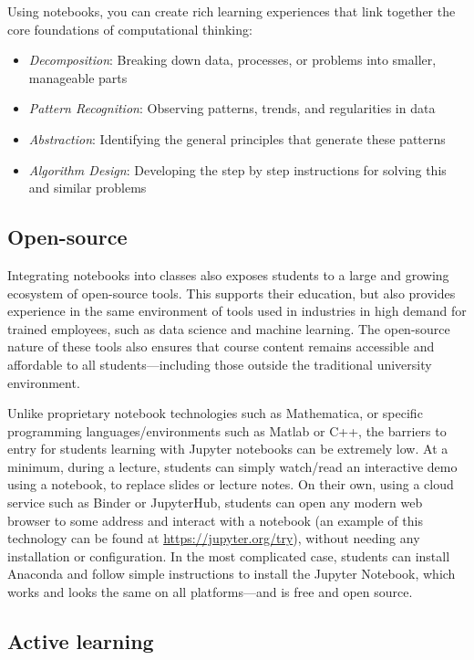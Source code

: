 \documentclass[]{book}
\providecommand{\tightlist}{%
  \setlength{\itemsep}{0pt}\setlength{\parskip}{0pt}}
\begin{document}
Using notebooks, you can create rich learning experiences that link
together the core foundations of computational thinking:

\begin{itemize}
\tightlist
\item
  \emph{Decomposition}: Breaking down data, processes, or problems into
  smaller, manageable parts
\item
  \emph{Pattern Recognition}: Observing patterns, trends, and
  regularities in data
\item
  \emph{Abstraction}: Identifying the general principles that generate
  these patterns
\item
  \emph{Algorithm Design}: Developing the step by step instructions for
  solving this and similar problems
\end{itemize}

\subsection{Open-source}\label{open-source}

Integrating notebooks into classes also exposes students to a large and
growing ecosystem of open-source tools. This supports their education,
but also provides experience in the same environment of tools used in
industries in high demand for trained employees, such as data science
and machine learning. The open-source nature of these tools also ensures
that course content remains accessible and affordable to all
students---including those outside the traditional university
environment.

Unlike proprietary notebook technologies such as Mathematica, or
specific programming languages/environments such as Matlab or C++, the
barriers to entry for students learning with Jupyter notebooks can be
extremely low. At a minimum, during a lecture, students can simply
watch/read an interactive demo using a notebook, to replace slides or
lecture notes. On their own, using a cloud service such as Binder or
JupyterHub, students can open any modern web browser to some address and
interact with a notebook (an example of this technology can be found at
\url{https://jupyter.org/try}), without needing any installation or
configuration. In the most complicated case, students can install
Anaconda and follow simple instructions to install the Jupyter Notebook,
which works and looks the same on all platforms---and is free and open
source.

\subsection{Active learning}\label{active-learning}
\end{document}
